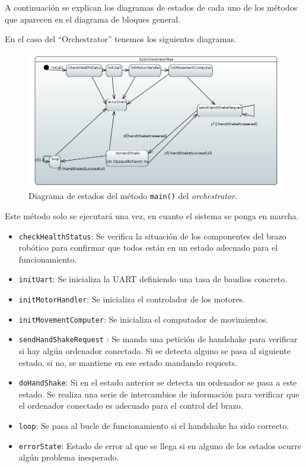 A continuación se explican los diagramas de estados de cada uno de los métodos que aparecen en el diagrama de bloques general.

En el caso del ``Orchestrator'' tenemos los siguientes diagramas.

\begin{figure}[H]
    \centering
    \includegraphics[width=1\linewidth]{pictures/S2OrchestratorMain.PNG}
    \caption{Diagrama de estados del método \texttt{main()} del \textit{orchestrator}.}
    \label{fig:fun_main_orchestrator}
\end{figure}

Este método solo se ejecutará una vez, en cuanto el sistema se ponga en marcha. 

\begin{itemize}
    \item \texttt{checkHealthStatus}: Se verifica la situación de los componentes del brazo robótico para confirmar que todos están en un estado adecuado para el funcionamiento. 
    \item \texttt{initUart}: Se inicializa la UART definiendo una tasa de baudios concreto.
    \item \texttt{initMotorHandler}: Se inicializa el controlador de los motores.
    \item \texttt{initMovementComputer}: Se inicializa el computador de movimientos.
    \item \texttt{sendHandShakeRequest} : Se manda una petición de handshake para verificar si hay algún ordenador conectado. Si se detecta alguno se pasa al siguiente estado, si no, se mantiene en ese estado mandando requests.
    \item \texttt{doHandShake}: Si en el estado anterior se detecta un ordenador se pasa a este estado. Se realiza una serie de intercambios de información para verificar que el ordenador conectado es adecuado para el control del brazo.
    \item \texttt{loop}: Se pasa al bucle de funcionamiento si el handshake ha sido correcto.
    \item \texttt{errorState}: Estado de error al que se llega si en alguno de los estados ocurre algún problema inesperado. 
    
    
\end{itemize}

